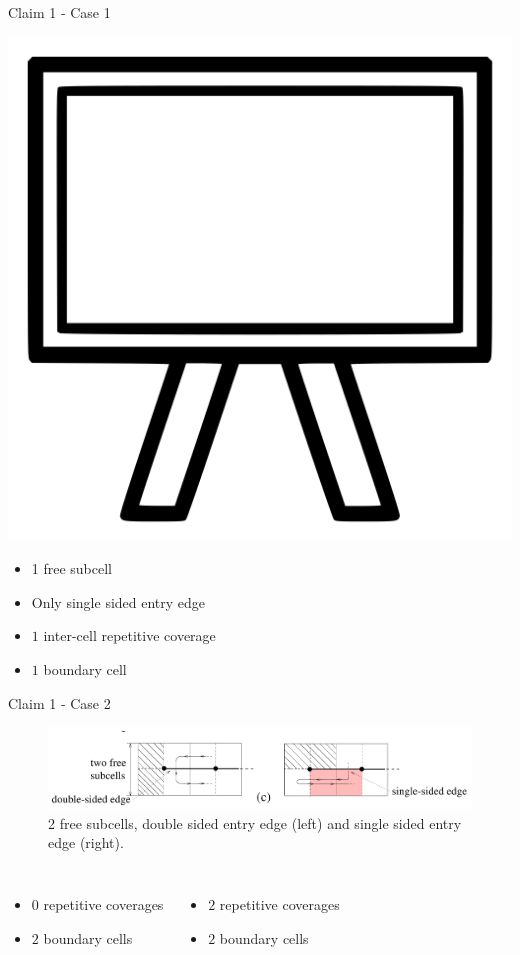 \documentclass{beamer}
\begin{document}
\begin{frame}{Claim 1 - Case 1}
    \centerline{\includegraphics[width=0.2\linewidth]{Images/board.png}}
    \pause
    \begin{itemize}
        \item 1 free subcell
        \item Only single sided entry edge
        \item $1$ inter-cell repetitive coverage
        \item $1$ boundary cell
    \end{itemize}
\end{frame}

\begin{frame}{Claim 1 - Case 2}
    \begin{figure}
        \includegraphics[width=\linewidth]{Images/inv_10_bot.png}
        \caption{2 free subcells, double sided entry edge (left) and single sided entry edge (right).}
    \end{figure}
    \begin{columns}
        \begin{itemize}
            \item $0$ repetitive coverages
            \item $2$ boundary cells
        \end{itemize}

        \begin{itemize}
            \item $2$ repetitive coverages
            \item $2$ boundary cells
        \end{itemize}
    \end{columns}
\end{frame}
\end{document}
